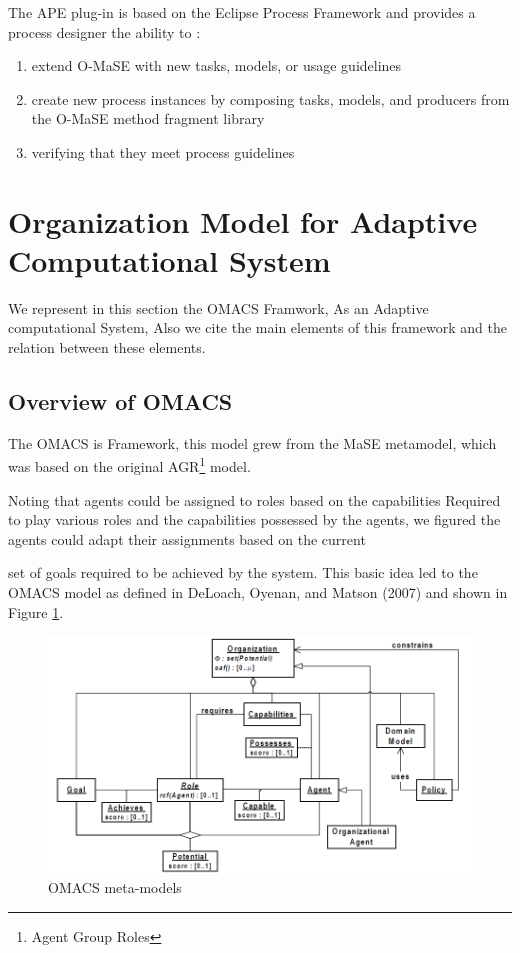 The APE plug-in is based on the Eclipse Process Framework and provides a process designer the ability to : 
\begin{enumerate}
\item 
	extend O-MaSE with new tasks, models, or usage guidelines
\item
	create new process instances by composing tasks, models, and producers from the O-MaSE method fragment library 
\item
	 verifying that they meet process guidelines
\end{enumerate} 
 
\section{Organization Model for Adaptive Computational System}
We represent in this section the OMACS Framwork, As an Adaptive computational System, Also we cite the main elements of this framework and the relation between these elements.
\subsection{Overview of OMACS}
The OMACS is Framework, this model grew from the MaSE metamodel, 
which was based on the original AGR\footnote{Agent Group Roles} model\cite{omacs4}.
 
Noting that agents could be assigned to roles based on the capabilities 
Required to play various roles and the capabilities possessed by the agents,
we figured the agents could adapt their assignments based on the current 


set of goals required to be achieved by the system.
This basic idea led to the OMACS model as defined in DeLoach,
Oyenan, and Matson (2007) and shown in Figure \ref{fig:OMACS meta-models}\cite{omacs4}.

\begin{figure}[th]
	\centering
		\includegraphics[scale=0.6]{ch1/img/omacs}
	\caption{\label{fig:OMACS meta-models}OMACS meta-models \cite{omacs0}}
\end{figure}

